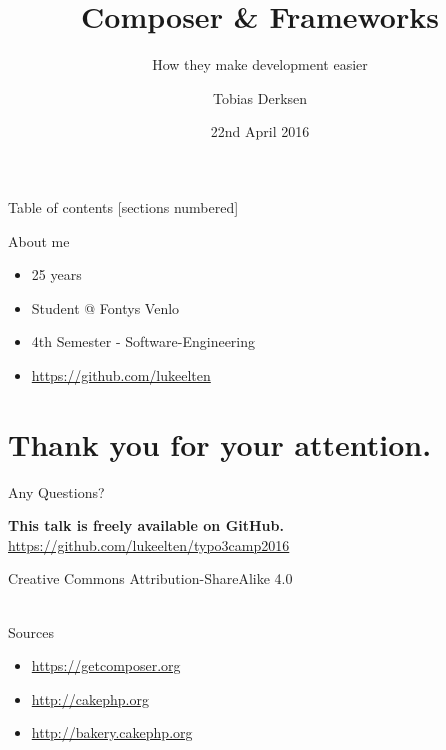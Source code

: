 \documentclass{beamer}
\title{Composer \& Frameworks}
\subtitle{How they make development easier}
\date{22nd April 2016}
\author{Tobias Derksen}
\institute{Fontys School of Technology \& Logistics}
\begin{document}
  \maketitle

  \begin{frame}{Table of contents}
    [sections numbered]
    \tableofcontents[hideallsubsections]
  \end{frame}


  \begin{frame}{About me}
  	\begin{itemize}
  		\item 25 years
  		\item Student @ Fontys Venlo
  		\item 4th Semester - Software-Engineering
  		\item \url{https://github.com/lukeelten}
  	\end{itemize}
  \end{frame}

  
  

	\section*{Thank you for your attention.}
	\begin{frame}[standout]
		Any Questions?
	\end{frame}
	
	\appendix
	
	\begin{frame}{}
		\textbf{This talk is freely available on GitHub.} \\
		\url{https://github.com/lukeelten/typo3camp2016}
		\vfill
		\begin{center}
			Creative Commons Attribution-ShareAlike 4.0 ~\\~\\
			\ccbysa
		\end{center}
	\end{frame}
	
	\begin{frame}{Sources}
		\begin{itemize}
			\item \url{https://getcomposer.org}
			\item \url{http://cakephp.org}
			\item \url{http://bakery.cakephp.org}
		\end{itemize}
	\end{frame}
\end{document}
